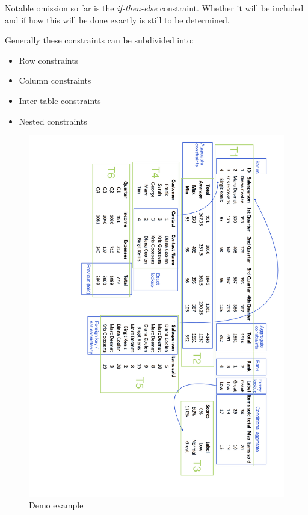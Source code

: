 \documentclass[a4paper]{article}
\begin{document}
Notable omission so far is the \textit{if-then-else} constraint. Whether it will be included and if how this will be done exactly is still to be determined.

Generally these constraints can be subdivided into:

\begin{itemize}
	\item Row constraints
	\item Column constraints
	\item Inter-table constraints
	\item Nested constraints
\end{itemize}

\begin{figure}
  \centering
    \includegraphics[width=1\linewidth]{Demo.png}
  \caption{Demo example}
  \label{fig:demo}
\end{figure}
\end{document}
